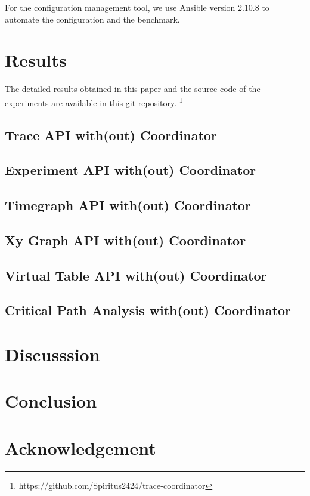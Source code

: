 For the configuration management tool, we use Ansible \cite{ansibleAnsibleSimple} version 2.10.8 to automate the configuration and the benchmark.

\section{Results}

The detailed results obtained in this paper and the source code of the experiments are available in this git repository. \footnote{https://github.com/Spiritus2424/trace-coordinator}

\subsection{Trace API with(out) Coordinator}

\subsection{Experiment API with(out) Coordinator}

\subsection{Timegraph API with(out) Coordinator}

\subsection{Xy Graph API with(out) Coordinator}

\subsection{Virtual Table API with(out) Coordinator}

\subsection{Critical Path Analysis with(out) Coordinator}

\section{Discusssion}

\section{Conclusion}

\section{Acknowledgement}